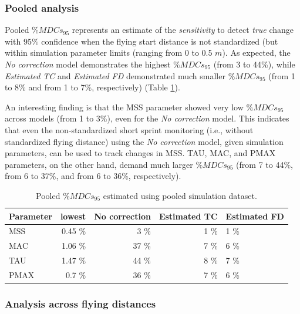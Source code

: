 \documentclass[fleqn,10pt]{wlpeerj} %
\begin{document}
\hypertarget{pooled-analysis-1}{%
\subsubsection{Pooled analysis}\label{pooled-analysis-1}}

Pooled \(\%MDCs_{95}\) represents an estimate of the \emph{sensitivity} to detect \emph{true} change with 95\% confidence when the flying start distance is not standardized (but within simulation parameter limits (ranging from 0 to 0.5 \(m\)). As expected, the \emph{No correction} model demonstrates the highest \(\%MDCs_{95}\) (from 3 to 44\%), while \emph{Estimated TC} and \emph{Estimated FD} demonstrated much smaller \(\%MDCs_{95}\) (from 1 to 8\% and from 1 to 7\%, respectively) (Table \ref{tab:tbl-pooled-MDC}).

An interesting finding is that the MSS parameter showed very low \(\%MDCs_{95}\) across models (from 1 to 3\%), even for the \emph{No correction} model. This indicates that even the non-standardized short sprint monitoring (i.e., without standardized flying distance) using the \emph{No correction} model, given simulation parameters, can be used to track changes in MSS. TAU, MAC, and PMAX parameters, on the other hand, demand much larger \(\%MDCs_{95}\) (from 7 to 44\%, from 6 to 37\%, and from 6 to 36\%, respectively).



\begin{table}

\caption{\label{tab:tbl-pooled-MDC}Pooled \(\%MDCs_{95}\) estimated using pooled simulation dataset.}
\centering
\begin{tabular}[t]{lrrrl}
\toprule
Parameter & lowest & No correction & Estimated TC & Estimated FD\\
\midrule
MSS & 0.45 \% & 3 \% & 1 \% & 1 \%\\
MAC & 1.06 \% & 37 \% & 7 \% & 6 \%\\
TAU & 1.47 \% & 44 \% & 8 \% & 7 \%\\
PMAX & 0.7 \% & 36 \% & 7 \% & 6 \%\\
\bottomrule
\end{tabular}
\end{table}

\hypertarget{analysis-across-flying-distances-1}{%
\subsubsection{Analysis across flying distances}\label{analysis-across-flying-distances-1}}
\end{document}
